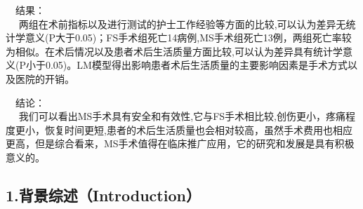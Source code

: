 \documentclass[
]{article}
\begin{document}
 结果：\\
 
两组在术前指标以及进行测试的护士工作经验等方面的比较,可以认为差异无统计学意义(P大于0.05)；FS手术组死亡14病例,MS手术组死亡13例，两组死亡率较为相似。在术后情况以及患者术后生活质量方面比较,可以认为差异具有统计学意义(P小于0.05)。LM模型得出影响患者术后生活质量的主要影响因素是手术方式以及医院的开销。

 结论：\\
 
我们可以看出MS手术具有安全和有效性,它与FS手术相比较,创伤更小，疼痛程度更小，恢复时间更短,患者的术后生活质量也会相对较高，虽然手术费用也相应更高，但是综合看来，MS手术值得在临床推广应用，它的研究和发展是具有积极意义的。

\hypertarget{ux80ccux666fux7efcux8ff0introduction}{%
\subsection{1.背景综述（Introduction）}\label{ux80ccux666fux7efcux8ff0introduction}}
\end{document}
